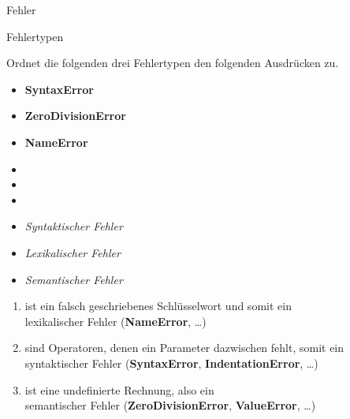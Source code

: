 \begin{task}[points=auto]{Fehler}
    \begin{subtask*}[points=0]{Fehlertypen }

        Ordnet die folgenden drei Fehlertypen den folgenden Ausdrücken zu.
        \begin{multicols}{3}
            \begin{itemize}
                \item[] \textbf{SyntaxError}
                \item[] \textbf{ZeroDivisionError}
                \item[] \textbf{NameError}
            \end{itemize}
            \begin{itemize}
                \item[] 
                \item[] 
                \item[] 
            \end{itemize}
            \begin{itemize}
                \item[] \textit{Syntaktischer Fehler}
                \item[] \textit{Lexikalischer Fehler}
                \item[] \textit{Semantischer Fehler}
            \end{itemize}
        \end{multicols}

        \begin{solution}
            \begin{enumerate}
                \item {} ist ein falsch geschriebenes Schlüsselwort und
                    somit ein \\ lexikalischer Fehler (\textbf{NameError}, \dots)
                \item {} sind Operatoren, denen ein Parameter dazwischen
                    fehlt, somit ein
                    \\ syntaktischer Fehler (\textbf{SyntaxError}, \textbf{IndentationError}, \dots)
                \item {} ist eine undefinierte Rechnung, also ein
                    \\ semantischer Fehler (\textbf{ZeroDivisionError}, \textbf{ValueError}, \dots)
            \end{enumerate}


\end{solution}
\end{subtask*}
\end{task}
